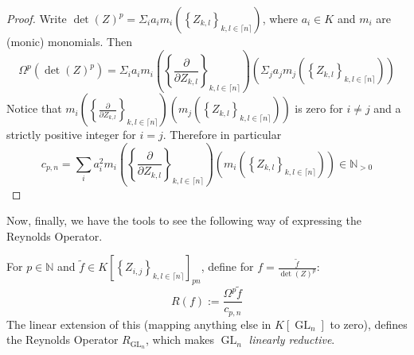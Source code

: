 \begin{proof}
  Write $ \operatorname{det} (Z)^p = \Sigma_i a_i m_i \left( \left\{ Z_{k,l} \right\}_{k,l \in \lceil n \rceil} \right) $, where $a_i \in K$ and $m_i$ are (monic) monomials.
  Then
  \begin{equation}
    \Omega^p \left( \operatorname{det} (Z)^p \right)
    = \Sigma_i a_i m_i \left( \left\{ \frac{\partial}{\partial Z_{k,l}} \right\}_{k,l \in \lceil n \rceil} \right) \left( \Sigma_j a_j m_j \left( \left\{ Z_{k,l} \right\}_{k,l \in \lceil n \rceil} \right) \right)
\end{equation}
Notice that $ m_i \left( \left\{ \frac{\partial}{\partial Z_{k,l}} \right\}_{k,l \in \lceil n \rceil} \right) \left( m_j \left( \left\{ Z_{k,l} \right\}_{k,l \in \lceil n \rceil} \right) \right) $ is zero for $ i \neq j $ and a strictly positive integer for $ i = j $. Therefore in particular
\begin{equation}
  c_{p,n}
  = \sum_i a_i^2 m_i \left( \left\{ \frac{\partial}{\partial Z_{k,l}} \right\}_{k,l \in \lceil n \rceil} \right) \left( m_i \left( \left\{ Z_{k,l} \right\}_{k,l \in \lceil n \rceil} \right) \right) \in \mathbb{N}_{>0}
\end{equation}
\end{proof}
Now, finally, we have the tools to see the following way of expressing the Reynolds Operator.
\begin{theorem}
  For $ p \in \mathbb{N} $ and $ \tilde{f} \in K \left\lbrack \left\{ Z_{i,j} \right\}_{k,l \in \lceil n \rceil} \right\rbrack_{pn} $, define for $ f = \frac{\tilde{f}}{\operatorname{det}(Z)^p}$:
  \begin{equation}
    R \left( f \right) := \frac{\Omega^p \tilde{f}}{c_{p,n}}
  \end{equation}
  The linear extension of this (mapping anything else in $K \left\lbrack \operatorname{GL}_n \right\rbrack$ to zero), defines the Reynolds Operator $R_{\operatorname{GL}_n}$, which makes $\operatorname{GL}_n$ \textit{linearly reductive}.
\end{theorem}

